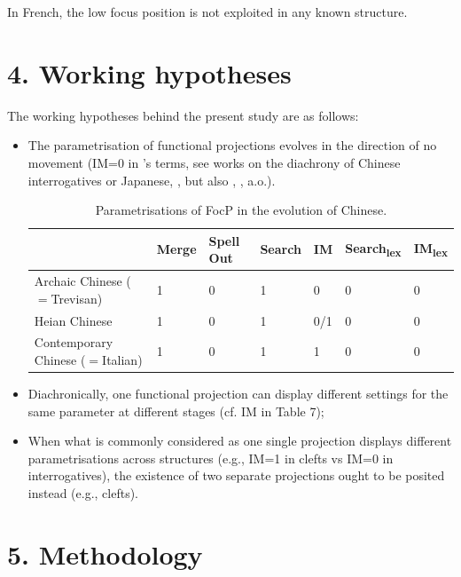\documentclass[fleqn,10pt]{wlscirep}
\begin{document}
\noindent In French, the low focus position is not exploited in any known structure.

\section*{4. Working hypotheses}
The working hypotheses behind the present study are as follows:

\begin{itemize}
\item The parametrisation of functional projections evolves in the direction of no movement (IM=0 in \citeauthor{rizzi2017}’s \citeyear{rizzi2017} terms, see works on the diachrony of Chinese interrogatives \citealt{aldridge2010clause} or Japanese, \citealt{aldridge2009old}, but also \citealt{roberts2003syntactic}, \citealt{dadan2019}, a.o.).

\begin{table}[ht]
    \centering
    \begin{tabular}{|l|l|l|l|l|l|l|}
    \hline
     & Merge & Spell Out & Search & IM & Search\textsubscript{lex} & IM\textsubscript{lex} \\
    \hline
    Archaic Chinese ($=$Trevisan) & 1 & 0 & 1 & 0 & 0 & 0\\
    \hline
    Heian Chinese & 1 & 0 & 1 & 0/1 & 0 & 0 \\
    \hline
    Contemporary Chinese ($=$Italian) & 1 & 0 & 1 & 1 & 0 & 0 \\
    \hline
    \end{tabular}
    \caption{\label{tab:samp2}Parametrisations of FocP in the evolution of Chinese.}
    \end{table}

\item Diachronically, one functional projection can display different settings for the same parameter at different stages (cf. IM in Table 7);

\item When what is commonly considered as one single projection displays different parametrisations across structures (e.g., IM=1 in clefts vs IM=0 in interrogatives), the existence of two separate projections ought to be posited instead (e.g., clefts).
\end{itemize}

\section*{5. Methodology}
\end{document}
